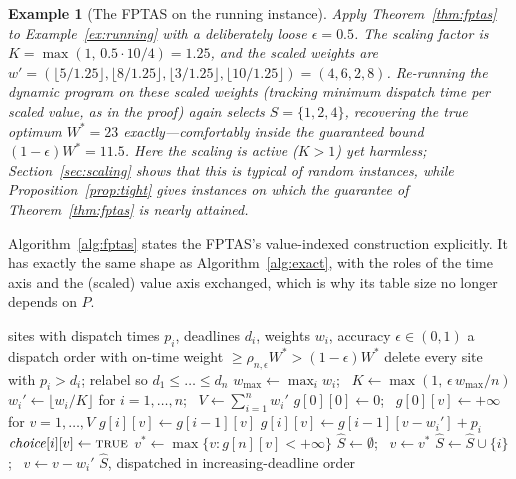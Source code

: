 \documentclass[pdflatex,sn-mathphys-ay]{sn-jnl}
\theoremstyle{thmstyleone}
\theoremstyle{thmstyletwo}
\theoremstyle{thmstylethree}
\newtheorem{example}{Example}
\begin{document}
\begin{example}[The FPTAS on the running instance]\label{ex:fptas}
Apply Theorem~\ref{thm:fptas} to Example~\ref{ex:running} with a
deliberately loose $\epsilon = 0.5$. The scaling factor is $K =
\max(1,\, 0.5 \cdot 10/4) = 1.25$, and the scaled weights are $w' =
(\lfloor 5/1.25\rfloor, \lfloor 8/1.25\rfloor, \lfloor 3/1.25\rfloor,
\lfloor 10/1.25\rfloor) = (4,6,2,8)$. Re-running the dynamic program on
these scaled weights (tracking minimum dispatch time per scaled value,
as in the proof) again selects $S=\{1,2,4\}$, recovering the true
optimum $W^\ast=23$ exactly---comfortably inside the guaranteed bound
$(1-\epsilon)W^\ast = 11.5$. Here the
scaling is active ($K>1$) yet harmless; Section~\ref{sec:scaling} shows
that this is typical of random instances, while
Proposition~\ref{prop:tight} gives instances on which the guarantee of
Theorem~\ref{thm:fptas} is nearly attained.
\end{example}

Algorithm~\ref{alg:fptas} states the FPTAS's value-indexed construction
explicitly. It has exactly the same shape as Algorithm~\ref{alg:exact},
with the roles of the time axis and the (scaled) value axis exchanged,
which is why its table size no longer depends on $P$.

\begin{algorithm}
\caption{FPTAS for MWHED (Theorem~\ref{thm:fptas})}\label{alg:fptas}
\begin{algorithmic}[1]
\Require sites with dispatch times $p_i$, deadlines $d_i$, weights $w_i$, accuracy $\epsilon\in(0,1)$
\Ensure a dispatch order with on-time weight $\ge \rho_{n,\epsilon}W^\ast>(1-\epsilon)W^\ast$
\State delete every site with $p_i > d_i$; relabel so $d_1\le\dots\le d_n$
\State $w_{\max} \gets \max_i w_i$; \ $K \gets \max(1,\, \epsilon\, w_{\max}/n)$
\State $w_i' \gets \lfloor w_i/K \rfloor$ for $i=1,\dots,n$; \ $V \gets \sum_{i=1}^n w_i'$
\State $g[0][0] \gets 0$; \ $g[0][v] \gets +\infty$ for $v=1,\dots,V$
    \State $g[i][v] \gets g[i-1][v]$ 
        \State $g[i][v] \gets g[i-1][v-w_i'] + p_i$
        \State $\mathit{choice}[i][v] \gets \textsc{true}$
      \EndIf
    \EndIf
  \EndFor
\EndFor
\State $v^\ast \gets \max\{v : g[n][v] < +\infty\}$
\State $\hat S \gets \emptyset$; \ $v \gets v^\ast$
 
    \State $\hat S \gets \hat S \cup \{i\}$; \ $v \gets v - w_i'$
  \EndIf
\EndFor
\State \Return $\hat S$, dispatched in increasing-deadline order
\end{algorithmic}
\end{algorithm}
\end{document}
